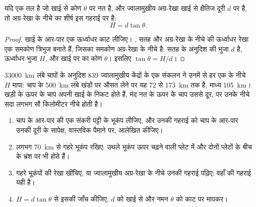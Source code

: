 \begin{proposition}[ज्वालामुखीय अग्र-रेखा के नीचे की स्लैब]\label{prop:g12:subduction-magmatism:depth}
यदि  एक तल है जो खाई से कोण $\theta$ पर नत है, और
ज्वालामुखीय अग्र-रेखा खाई से क्षैतिज दूरी $d$ पर है, तो
अग्र-रेखा के नीचे  का शीर्ष इस गहराई पर है:
\[
  H = d \tan\theta .
\]
\end{proposition}

\begin{proof}
खाई के आर-पार एक ऊर्ध्वाधर काट लीजिए। , सतह और
अग्र-रेखा के नीचे की ऊर्ध्वाधर रेखा एक समकोण त्रिभुज बनाते हैं, जिसका समकोण
अग्र-रेखा के नीचे है: सतह के अनुदिश की भुजा $d$ है, ऊर्ध्वाधर भुजा
$H$, और खाई पर का कोण $\theta$। इसलिए $\tan\theta = H/d$।
\end{proof}

\qty{33000}{km} लंबे चापों के अनुदिश 839 ज्वालामुखीय केंद्रों के एक संकलन ने
उनमें से हर एक के नीचे $H$ मापा: चाप के \qty{500}{km} लंबे खंडों पर औसत लेने पर
यह 72 से \qty{173}{km} तक है, माध्य \qty{105}{km}। खड़ी
 के ऊपर के चाप अपनी खाई के निकट होते हैं, मंद नत  के ऊपर के चाप उससे
दूर, पर उनके नीचे  सदा लगभग सौ किलोमीटर
नीचे होती है।

\begin{method}[किसी ज्वालामुखी के नीचे स्लैब ढूँढ़ना]\label{met:g12:subduction-magmatism:slab}
\begin{enumerate}
  \item चाप के आर-पार की एक संकरी पट्टी के भूकंप लीजिए, और उनकी
        गहराई को चाप के आर-पार उनकी दूरी के सापेक्ष, वास्तविक पैमाने पर, आलेखित कीजिए।
  \item लगभग \qty{70}{km} से गहरे भूकंप रखिए: उथले भूकंप
        ऊपर चढ़ने वाली प्लेट में और दोनों प्लेटों के बीच के भ्रंश पर
        भी होते हैं।
  \item गहरे भूकंपों की रेखा खींचिए, या ज्वालामुखीय अग्र-रेखा के नीचे
        उनकी गहराई पढ़िए: वहाँ  की गहराई यही है।
  \item $H = d\tan\theta$ से इसकी जाँच कीजिए, $d$ को खाई से और
        नमन $\theta$ को काट पर मापकर।
\end{enumerate}
\end{method}

